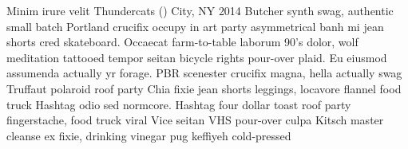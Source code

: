 \documentclass[letterpaper,11pt]{coaxialcv}
\begin{document}
  \formerjob
    {Minim irure velit}
    {Thundercats ()}
    {City, NY}
    {2014}
    {Butcher synth swag, authentic small batch Portland crucifix occupy in art party asymmetrical banh mi jean shorts 
    cred skateboard. Occaecat farm-to-table laborum 90's dolor, wolf meditation tattooed tempor seitan bicycle rights 
    pour-over plaid. Eu eiusmod assumenda actually yr forage. PBR scenester crucifix magna, hella actually swag 
    Truffaut polaroid roof party}
  \workitems
    {Chia fixie jean shorts leggings, locavore flannel food truck}
    {Hashtag odio sed normcore. Hashtag four dollar toast roof party fingerstache, food truck viral Vice seitan VHS 
    pour-over culpa}
    {Kitsch master cleanse ex fixie, drinking vinegar pug keffiyeh cold-pressed}
    {}

\end{document}
